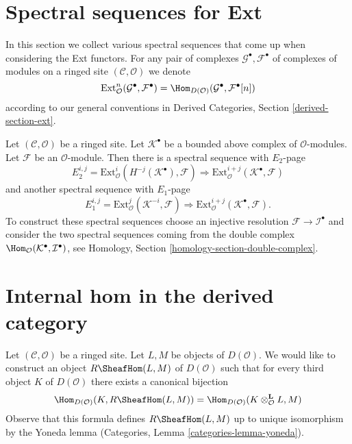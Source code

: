 \section{Spectral sequences for Ext}
\label{section-spectral-sequence-ext}

\noindent
In this section we collect various spectral sequences that come up
when considering the Ext functors. For any pair of complexes
$\mathcal{G}^\bullet, \mathcal{F}^\bullet$ of complexes of modules
on a ringed site $(\mathcal{C}, \mathcal{O})$ we denote
$$
\text{Ext}^n_\mathcal{O}(\mathcal{G}^\bullet, \mathcal{F}^\bullet)
=
\Hom_{D(\mathcal{O})}(\mathcal{G}^\bullet, \mathcal{F}^\bullet[n])
$$
according to our general conventions in
Derived Categories, Section \ref{derived-section-ext}.

\begin{example}
\label{example-hom-complex-into-sheaf}
Let $(\mathcal{C}, \mathcal{O})$ be a ringed site.
Let $\mathcal{K}^\bullet$ be a bounded above complex of $\mathcal{O}$-modules.
Let $\mathcal{F}$ be an $\mathcal{O}$-module. Then there is a
spectral sequence with $E_2$-page
$$
E_2^{i, j} =
\text{Ext}_\mathcal{O}^i(H^{-j}(\mathcal{K}^\bullet), \mathcal{F})
\Rightarrow
\text{Ext}_\mathcal{O}^{i + j}(\mathcal{K}^\bullet, \mathcal{F})
$$
and another spectral sequence with $E_1$-page
$$
E_1^{i, j} =
\text{Ext}_\mathcal{O}^j(\mathcal{K}^{-i}, \mathcal{F})
\Rightarrow
\text{Ext}_\mathcal{O}^{i + j}(\mathcal{K}^\bullet, \mathcal{F}).
$$
To construct these spectral sequences choose an injective resolution
$\mathcal{F} \to \mathcal{I}^\bullet$ and consider the two spectral
sequences coming from the double complex
$\Hom_\mathcal{O}(\mathcal{K}^\bullet, \mathcal{I}^\bullet)$, see
Homology, Section \ref{homology-section-double-complex}.
\end{example}








\section{Internal hom in the derived category}
\label{section-internal-hom}

\noindent
Let $(\mathcal{C}, \mathcal{O})$ be a ringed site. Let $L, M$ be objects
of $D(\mathcal{O})$. We would like to construct an object
$R\SheafHom(L, M)$ of $D(\mathcal{O})$ such that for every third
object $K$ of $D(\mathcal{O})$ there exists a canonical bijection
\begin{equation}
\label{equation-internal-hom}
\Hom_{D(\mathcal{O})}(K, R\SheafHom(L, M))
=
\Hom_{D(\mathcal{O})}(K \otimes_\mathcal{O}^\mathbf{L} L, M)
\end{equation}
Observe that this formula defines $R\SheafHom(L, M)$ up to unique
isomorphism by the Yoneda lemma
(Categories, Lemma \ref{categories-lemma-yoneda}).

